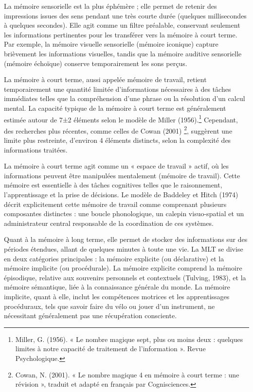 \documentclass[12pt,a4paper]{report}
\begin{document}
La mémoire sensorielle est la plus éphémère ; elle permet de retenir des impressions issues des sens pendant une très courte durée (quelques millisecondes à quelques secondes). Elle agit comme un filtre préalable, conservant seulement les informations pertinentes pour les transférer vers la mémoire à court terme. Par exemple, la mémoire visuelle sensorielle (mémoire iconique) capture brièvement les informations visuelles, tandis que la mémoire auditive sensorielle (mémoire échoïque) conserve temporairement les sons perçus.

La mémoire à court terme, aussi appelée mémoire de travail, retient temporairement une quantité limitée d’informations nécessaires à des tâches immédiates telles que la compréhension d'une phrase ou la résolution d’un calcul mental. La capacité typique de la mémoire à court terme est généralement estimée autour de 7±2 éléments selon le modèle de Miller (1956).\footnote{Miller, G. (1956). « Le nombre magique sept, plus ou moins deux : quelques limites à notre capacité de traitement de l’information ». Revue Psychologique.} Cependant, des recherches plus récentes, comme celles de Cowan (2001) \footnote{Cowan, N. (2001). « Le nombre magique 4 en mémoire à court terme : une révision », traduit et adapté en français par Cognisciences.}, suggèrent une limite plus restreinte, d'environ 4 éléments distincts, selon la complexité des informations traitées.

La mémoire à court terme agit comme un « espace de travail » actif, où les informations peuvent être manipulées mentalement (mémoire de travail). Cette mémoire est essentielle à des tâches cognitives telles que le raisonnement, l'apprentissage et la prise de décisions. Le modèle de Baddeley et Hitch (1974) décrit explicitement cette mémoire de travail comme comprenant plusieurs composantes distinctes : une boucle phonologique, un calepin visuo-spatial et un administrateur central responsable de la coordination de ces systèmes.

Quant à la mémoire à long terme, elle permet de stocker des informations sur des périodes étendues, allant de quelques minutes à toute une vie. La MLT se divise en deux catégories principales : la mémoire explicite (ou déclarative) et la mémoire implicite (ou procédurale). La mémoire explicite comprend la mémoire épisodique, relative aux souvenirs personnels et contextuels (Tulving, 1983), et la mémoire sémantique, liée à la connaissance générale du monde. La mémoire implicite, quant à elle, inclut les compétences motrices et les apprentissages procéduraux, tels que savoir faire du vélo ou jouer d'un instrument, ne nécessitant généralement pas une récupération consciente.
\end{document}
